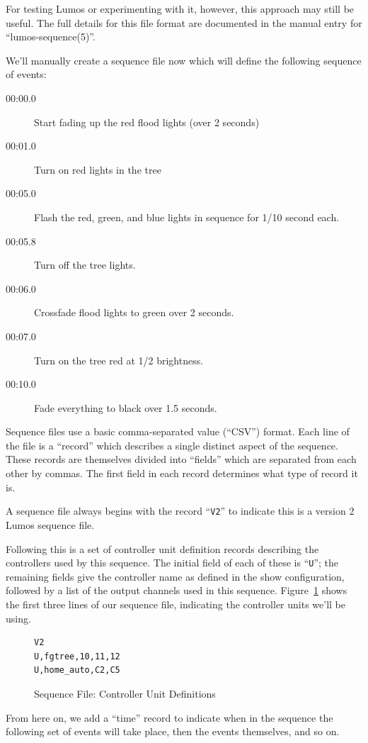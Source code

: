 \documentclass{article}
\begin{document}
For testing Lumos or experimenting with it, however, this approach may still
be useful.  The full details for this file format are documented in the manual
entry for ``lumos-sequence(5)''.

We'll manually create a sequence file now which will define the following
sequence of events:
\begin{description}
	\item[00:00.0]
		Start fading up the red flood lights (over 2 seconds)
	\item[00:01.0]
		Turn on red lights in the tree
	\item[00:05.0]
		Flash the red, green, and blue lights in sequence for 1/10 second
		each.
	\item[00:05.8]
		Turn off the tree lights.
	\item[00:06.0]
		Crossfade flood lights to green over 2 seconds.
	\item[00:07.0]
		Turn on the tree red at 1/2 brightness.
	\item[00:10.0]
		Fade everything to black over 1.5 seconds.
\end{description}

Sequence files use a basic comma-separated value (``CSV'') format.  Each 
line of the file is a ``record'' which describes a single distinct aspect
of the sequence.  These records are themselves divided into ``fields'' which
are separated from each other by commas.  The first field in each record
determines what type of record it is.

A sequence file always begins with the record ``{\tt V2}'' to indicate this is a
version 2 Lumos sequence file.  

Following this is a set of controller unit
definition records describing the controllers used by this sequence.  
The initial field of each of
these  is ``{\tt U}''; the remaining fields give the controller name as 
defined in the
show configuration, followed by a list of the output channels used in this
sequence.  Figure~\ref{seq:u}
shows the first three lines of our sequence file, indicating the controller
units we'll be using.

\begin{figure}[hbtp]
\begin{verbatim}
V2
U,fgtree,10,11,12
U,home_auto,C2,C5
\end{verbatim}
\caption{Sequence File: Controller Unit Definitions}
\label{seq:u}
\end{figure}

From here on, we add a ``time'' record to indicate when in the sequence
the following set of events will take place, then the events themselves, and
so on.  
\end{document}
